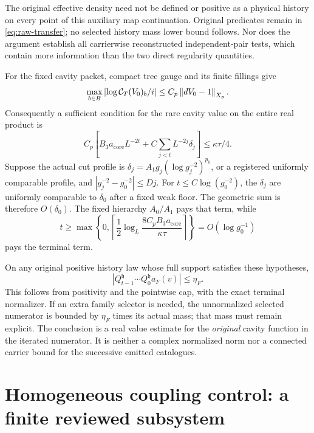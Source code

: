 The original effective density need not be defined or positive as a physical history on every point of this auxiliary map continuation. Original predicates remain in \eqref{eq:raw-transfer}; no selected history mass lower bound follows. Nor does the argument establish all carrierwise reconstructed independent-pair tests, which contain more information than the two direct regularity quantities.

For the fixed cavity packet, compact tree gauge and its finite fillings give
\[
 \max_{b\in B}\left|\log\mathcal C_T(V_0)_b/i\right|
 \le C_p\left\lVert dV_0-1\right\rVert_{X_p}.
\]
Consequently a sufficient condition for the rare cavity value on the entire real product is
\begin{equation}\label{eq:cavity-delay-condition}
 C_p\left[B_3a_{\mathrm{core}}L^{-2t}
              +C\sum_{j<t}L^{-2j}\delta_j\right]
 \le\kappa\tau/4.
\end{equation}
Suppose the actual cut profile is
$\delta_j=A_1g_j(\log g_j^{-2})^{p_0}$, or a registered uniformly comparable profile, and $|g_j^{-2}-g_0^{-2}|\le Dj$. For $t\le C\log(g_0^{-2})$, the $\delta_j$ are uniformly comparable to $\delta_0$ after a fixed weak floor. The geometric sum is therefore $O(\delta_0)$. The fixed hierarchy $A_0/A_1$ pays that term, while
\begin{equation}\label{eq:delay-time}
 t\ge\max\left\{0,\left\lceil
    \frac12\log_L\frac{8C_pB_3a_{\mathrm{core}}}{\kappa\tau}
                  \right\rceil\right\}
 =O(\log g_0^{-1})
\end{equation}
pays the terminal term.

On any original positive history law whose full support satisfies these hypotheses,
\begin{equation}\label{eq:real-prefix-value}
 \left|Q_{t-1}^{\mathfrak h}\cdots Q_0^{\mathfrak h}a_F(v)\right|
 \le\eta_F.
\end{equation}
This follows from positivity and the pointwise cap, with the exact terminal normalizer. If an extra family selector is needed, the unnormalized selected numerator is bounded by $\eta_F$ times its actual mass; that mass must remain explicit. The conclusion is a real value estimate for the \emph{original} cavity function in the iterated numerator. It is neither a complex normalized norm nor a connected carrier bound for the successive emitted catalogues.

\section{Homogeneous coupling control: a finite reviewed subsystem}
\label{sec:tuning}

